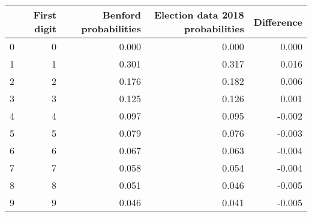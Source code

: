\begin{tabular}{lrrrr}
\toprule
 & First digit & Benford probabilities & Election data 2018 probabilities & Difference \\
\midrule
0 & 0 & 0.000 & 0.000 & 0.000 \\
1 & 1 & 0.301 & 0.317 & 0.016 \\
2 & 2 & 0.176 & 0.182 & 0.006 \\
3 & 3 & 0.125 & 0.126 & 0.001 \\
4 & 4 & 0.097 & 0.095 & -0.002 \\
5 & 5 & 0.079 & 0.076 & -0.003 \\
6 & 6 & 0.067 & 0.063 & -0.004 \\
7 & 7 & 0.058 & 0.054 & -0.004 \\
8 & 8 & 0.051 & 0.046 & -0.005 \\
9 & 9 & 0.046 & 0.041 & -0.005 \\
\bottomrule
\end{tabular}
